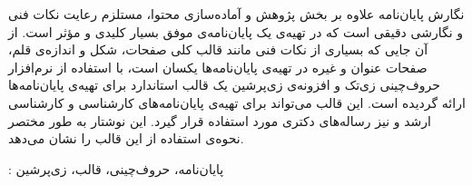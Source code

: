 


\begin{center}
\end{center}
\noindent

نگارش پایان‌نامه‌ علاوه بر بخش پژوهش و آماده‌سازی محتوا،
مستلزم رعایت نکات فنی و نگارشی دقیقی است 
که در تهیه‌ی یک پایان‌نامه‌ی موفق بسیار کلیدی و مؤثر است.
از آن جایی که بسیاری از نکات فنی مانند قالب کلی صفحات، شکل و اندازه‌ی قلم، 
صفحات عنوان و غیره در تهیه‌ی پایان‌نامه‌ها یکسان است،
با استفاده از نرم‌افزار حروف‌چینی زی‌تک %
و افزونه‌ی زی‌پرشین %
یک قالب استاندارد برای تهیه‌ی پایان‌نامه‌ها ارائه گردیده است.
این قالب می‌تواند برای تهیه‌ی پایان‌نامه‌های
کارشناسی و کارشناسی ارشد و نیز رساله‌ها‌ی دکتری مورد استفاده قرار گیرد.
این نوشتار به طور مختصر نحوه‌ی استفاده از این قالب را نشان می‌دهد.

\bigskip
\noindent {}: 
پایان‌نامه، حروف‌چینی، قالب، زی‌پرشین
\newpage
